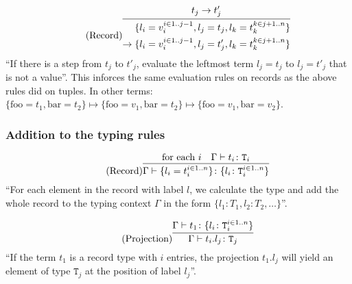 \begin{equation*}
    \tag{Record}
    \infer{
        \begin{split}
            \{l_i = v_i^{i \in 1..j-1}, l_j = t_j, l_k = t_k^{k \in j+1..n}\} \\
            \rightarrow \{l_i = v_i^{i \in 1..j-1}, l_j = t'_j, l_k = t_k^{k \in j+1..n}\}
        \end{split}
    }{
        t_j \rightarrow t'_j
    }
\end{equation*}
``If there is a step from $t_j$ to $t'_j$, evaluate the leftmost
term $l_j = t_j$ to $l_j = t'_j$ that is not a value''. This inforces
the same evaluation rules on records as the above rules did on tuples.
In other terms:
$\{\text{foo}=t_1, \text{bar}=t_2\} \mapsto \{\text{foo}=v_1, \text{bar}=t_2\} \mapsto \{\text{foo}=v_1, \text{bar}=v_2\}$.

\subsubsection{Addition to the typing rules \cite{pierce2002ProgLang}}
\begin{equation*}
    \tag{Record}
    \infer{
    \Gamma \vdash \{l_i = t_i^{i \in 1..n}\} \colon \{l_i \colon \texttt{T}_i^{i \in 1..n}\}
    }{
    \text{for each } i & \Gamma \vdash t_i \colon \texttt{T}_i
    }
\end{equation*}
``For each element in the record with label $l$, we calculate the type
and add the whole record to the typing context $\Gamma$ in the form
$\{l_1 \colon T_1, l_2 \colon T_2, \dots\}$''.

\begin{equation*}
    \tag{Projection}
    \infer{
    \Gamma \vdash t_i . l_j \colon \texttt{T}_j
    }{
    \Gamma \vdash t_1 \colon \{l_i \colon \texttt{T}_i^{i \in 1..n}\}
    }
\end{equation*}
``If the term $t_1$ is a record type with $i$ entries, the projection
$t_1 . l_j$ will yield an element of type $\texttt{T}_j$ at
the position of label $l_j$''.
